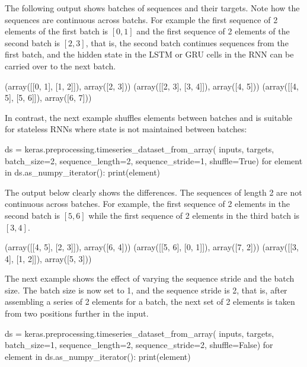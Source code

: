 The following output shows batches of sequences and their targets. Note how the sequences are continuous across batchs. For example the first sequence of 2 elements of the first batch is $[0, 1]$ and the first sequence of 2 elements of the second batch is $[2, 3]$, that is, the second batch continues sequences from the first batch, and the hidden state in the LSTM or GRU cells in the RNN can be carried over to the next batch. 
 
\begin{samepage}
\begin{textcode}
(array([[0, 1],
       [1, 2]]), array([2, 3]))
(array([[2, 3],
       [3, 4]]), array([4, 5]))
(array([[4, 5],
       [5, 6]]), array([6, 7]))
\end{textcode}
\end{samepage}

In contrast, the next example shuffles elements between batches and is suitable for stateless RNNs where state is not maintained between batches:

\begin{samepage}
\begin{pythoncode}
ds = keras.preprocessing.timeseries_dataset_from_array(
     inputs, targets, 
     batch_size=2, sequence_length=2, sequence_stride=1, shuffle=True)
for element in ds.as_numpy_iterator():
     print(element)
\end{pythoncode}
\end{samepage}

The output below clearly shows the differences. The sequences of length 2 are not continuous across batches. For example, the first sequence of 2 elements in the second batch is $[5, 6]$ while the first sequence of 2 elements in the third batch is $[3, 4]$.

\begin{samepage}
\begin{textcode}
(array([[4, 5],
       [2, 3]]), array([6, 4]))
(array([[5, 6],
       [0, 1]]), array([7, 2]))
(array([[3, 4],
       [1, 2]]), array([5, 3]))
\end{textcode}
\end{samepage}

The next example shows the effect of varying the sequence stride and the batch size. The batch size is now set to 1, and the sequence stride is 2, that is, after assembling a series of 2 elements for a batch, the next set of 2 elements is taken from two positions further in the input.

\begin{samepage}
\begin{pythoncode}
ds = keras.preprocessing.timeseries_dataset_from_array(
     inputs, targets,
     batch_size=1, sequence_length=2, sequence_stride=2, shuffle=False)
for element in ds.as_numpy_iterator():
     print(element)
\end{pythoncode}
\end{samepage}

